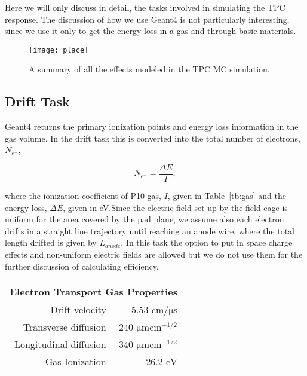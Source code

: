 Here we will only discuss in detail, the tasks involved in simulating the TPC response. The discussion of how we use Geant4 is not particularly interesting, since we use it only to get the energy loss in a gas and through basic materials. 

\begin{figure}
\texttt{[image: place]}
\caption{A summary of all the effects modeled in the TPC MC simulation.}
\label{fig:place}
\end{figure}

\subsection{Drift Task}
Geant4 returns the primary ionization points and energy loss information in the gas volume. In the drift task this is converted into the total number of electrons, $N_{e^-}$,

\begin{equation}
N_{e^{-}} =  \frac{\Delta E}{I},
\label{eq:kev2el}
\end{equation}
 
where the ionization coefficient of P10 gas, $I$, given in Table~\ref{tb:gas} and the energy loss, $\Delta E$, given in \si{\electronvolt}.Since the electric field set up by the field cage is uniform for the area covered by the pad plane, we assume also each electron drifts in a straight line trajectory until reaching an anode wire, where the total length drifted is given by $L_{anode}$. In this task the option to put in space charge effects and non-uniform electric fields are allowed but we do not use them for the further discussion of calculating efficiency. 


\begin{table*}\centering
{}
\begin{tabular}{@{}rr@{}}\toprule 
\multicolumn{2}{c}{Electron Transport Gas Properties} \\
 \midrule
Drift velocity & 5.53 $\si{\centi\meter\per\micro\second}$\\
Transverse diffusion & 240 $\si{\micro \meter \centi\meter}^{-1/2}$\\
Longitudinal diffusion &  340 $\si{\micro \meter \centi\meter}^{-1/2}$\\
Gas Ionization & 26.2 $\si{\eV}$\\
\bottomrule
\end{tabular}
\caption{An overview of the properties of the TPC}
\label{tb:gas}
\end{table*}


